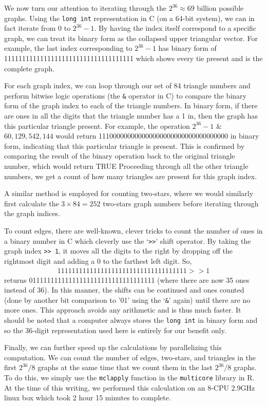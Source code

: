 We now turn our attention to iterating through the $2^{36} \approx 69$ billion possible graphs.  
Using the \texttt{long int} representation in C (on a 64-bit system), 
we can in fact iterate from 0 to $2^{36}-1$.  By having the index itself 
correspond to a specific graph,  we can treat its binary form as 
the collapsed upper triangular vector.
For example, the last index corresponding to $2^{36}-1$ has binary form of 
 111111111111111111111111111111111111 which shows every tie present and
 is the complete graph.
   
For each graph index, we can loop through our set of 84 triangle numbers
and perform bitwise logic operations (the \texttt{\&} operator in C) to 
compare the binary form of the graph index to each of the triangle numbers.  
In binary form, if there are ones in all the digits that the triangle number has a 1 in, 
then the graph has this particular triangle present.
For example, the operation $2^{36}-1$ \& $60,129,542,144$ would return 
111000000000000000000000000000000000 in binary form, indicating that this 
particular triangle is present.  This is confirmed by comparing the
result of the binary operation back to the original triangle number,
which would return TRUE  Proceeding through all the other triangle numbers, 
we get a count of how many triangles are present for this graph index.

A similar method is employed for counting two-stars, where we would similarly
first calculate the $3\times84 = 252$ two-stars graph numbers before iterating
through the graph indices.

To count edges, there are well-known, clever tricks to count the number of ones 
in a binary number in C which cleverly use the `\texttt{>>}' shift operator.
By taking the graph index \texttt{>> 1}, it moves all the digits to the 
right by dropping off the rightmost digit and adding a 0 to the 
farthest left digit.  So, 
\begin{align*}
111111111111111111111111111111111111 >> 1
\end{align*}
returns 01111111111111111111111111111111111 (where there are now 35 ones instead of 36).  
In this manner, the shifts can be continued and ones counted 
(done by another bit comparison to '01' using the `\texttt{\&}' again) 
until there are no more ones.  This approach avoids any arithmetic and is thus much faster.  
It should be noted that a computer always stores the \texttt{long int} in binary form 
and so the 36-digit representation used here is entirely for our benefit only.

Finally, we can further speed up the calculations by parallelizing this computation.  
We can count the number of edges, two-stars, and triangles in the 
first $2^{36}/8$ graphs at the same time that we count them in the last $2^{36}/8$ graphs.  
To do this, we simply use the \texttt{mclapply} function in the \texttt{multicore} \citep{multicore:R} 
library in R.
At the time of this writing, we performed this calculation on an 8-CPU 2.9GHz linux box
which took 2 hour 15 minutes to complete.  




